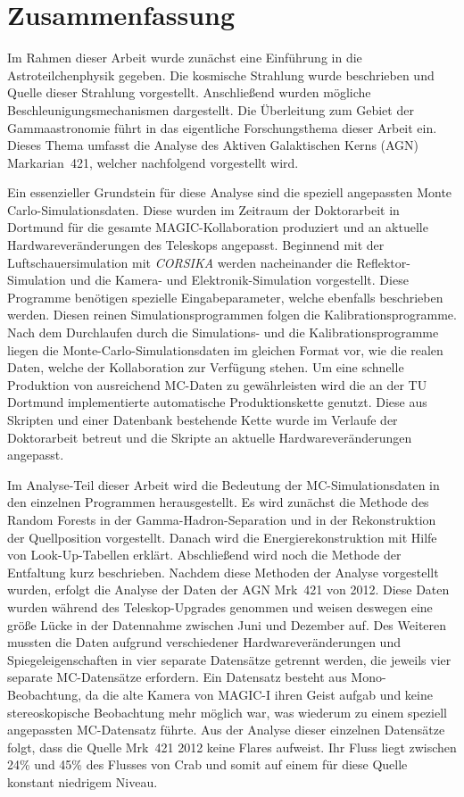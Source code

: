 \chapter{Zusammenfassung}
\label{chapter:Ergebnisse}
Im Rahmen dieser Arbeit wurde zunächst eine Einführung in die Astroteilchenphysik gegeben. 
Die kosmische Strahlung wurde beschrieben und Quelle dieser Strahlung vorgestellt.
Anschließend wurden mögliche Beschleunigungsmechanismen dargestellt.
Die Überleitung zum Gebiet der Gammaastronomie führt in das eigentliche Forschungsthema dieser Arbeit ein.
Dieses Thema umfasst die Analyse des Aktiven Galaktischen Kerns (AGN) Markarian~421, welcher nachfolgend vorgestellt wird.

Ein essenzieller Grundstein für diese Analyse sind die speziell angepassten Monte Carlo-Simulationsdaten.
Diese wurden im Zeitraum der Doktorarbeit in Dortmund für die gesamte MAGIC-Kollaboration produziert und an aktuelle Hardwareveränderungen des Teleskops angepasst.
Beginnend mit der Luftschauersimulation mit \textit{CORSIKA} werden nacheinander die Reflektor-Simulation und die Kamera- und Elektronik-Simulation vorgestellt.
Diese Programme benötigen spezielle Eingabeparameter, welche ebenfalls beschrieben werden.
Diesen reinen Simulationsprogrammen folgen die Kalibrationsprogramme. 
Nach dem Durchlaufen durch die Simulations- und die Kalibrationsprogramme liegen die Monte-Carlo-Simulationsdaten im gleichen Format vor, wie die realen Daten, welche der Kollaboration zur Verfügung stehen.
Um eine schnelle Produktion von ausreichend MC-Daten zu gewährleisten wird die an der TU Dortmund implementierte automatische Produktionskette genutzt.
Diese aus Skripten und einer Datenbank bestehende Kette wurde im Verlaufe der Doktorarbeit betreut und die Skripte an aktuelle Hardwareveränderungen angepasst.

Im Analyse-Teil dieser Arbeit wird die Bedeutung der MC-Simulationsdaten in den einzelnen Programmen herausgestellt.
Es wird zunächst die Methode des Random Forests in der Gamma-Hadron-Separation und in der Rekonstruktion der Quellposition vorgestellt.
Danach wird die Energierekonstruktion mit Hilfe von Look-Up-Tabellen erklärt.
Abschließend wird noch die Methode der Entfaltung kurz beschrieben.
Nachdem diese Methoden der Analyse vorgestellt wurden, erfolgt die Analyse der Daten der AGN Mrk~421 von 2012.
Diese Daten wurden während des Teleskop-Upgrades genommen und weisen deswegen eine größe Lücke in der Datennahme zwischen Juni und Dezember auf. 
Des Weiteren mussten die Daten aufgrund verschiedener Hardwareveränderungen und Spiegeleigenschaften in vier separate Datensätze getrennt werden, die jeweils vier separate MC-Datensätze erfordern.
Ein Datensatz besteht aus Mono-Beobachtung, da die alte Kamera von MAGIC-I ihren Geist aufgab und keine stereoskopische Beobachtung mehr möglich war, was wiederum zu einem speziell angepassten MC-Datensatz führte.
Aus der Analyse dieser einzelnen Datensätze folgt, dass die Quelle Mrk~421 2012 keine Flares aufweist.
Ihr Fluss liegt zwischen 24\% und 45\% des Flusses von Crab und somit auf einem für diese Quelle konstant niedrigem Niveau.

